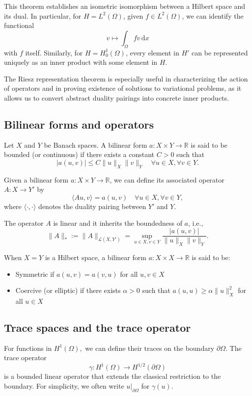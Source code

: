 This theorem establishes an isometric isomorphism between a Hilbert space and its dual. In particular, for $H = L^2(\Omega)$, given $f \in L^2(\Omega)$, we can identify the functional 
\[
v \mapsto \int_\Omega f v \, \mathrm{d}x
\]
with $f$ itself. Similarly, for $H = H^1_0(\Omega)$, every element in $H'$ can be represented uniquely as an inner product with some element in $H$.

The Riesz representation theorem is especially useful in characterizing the action of operators and in proving existence of solutions to variational problems, as it allows us to convert abstract duality pairings into concrete inner products.

\subsection{Bilinear forms and operators}

Let $X$ and $Y$ be Banach spaces. A bilinear form $a: X \times Y \to \mathbb{R}$ is said to be bounded (or continuous) if there exists a constant $C > 0$ such that
\[
|a(u, v)| \leq C \|u\|_X \|v\|_Y \quad \forall u \in X, \forall v \in Y.
\]

Given a bilinear form $a: X \times Y \to \mathbb{R}$, we can define its associated operator $A: X \to Y'$ by
\[
\langle Au, v \rangle = a(u, v) \quad \forall u \in X, \forall v \in Y,
\]
where $\langle \cdot, \cdot \rangle$ denotes the duality pairing between $Y'$ and $Y$.

The operator $A$ is linear and it inherits the boundedness of $a$, i.e.,
\[ 
  \|A\|_* := \|A\|_{\mathcal{L}(X,Y')} = \sup\limits_{u \in X, v \in Y} \frac{|a(u,v)|}{\|u\|_X \|v\|_Y}.
\]

When $X = Y$ is a Hilbert space, a bilinear form $a: X \times X \to \mathbb{R}$ is said to be:
\begin{itemize}
  \item Symmetric if $a(u, v) = a(v, u)$ for all $u, v \in X$
  \item Coercive (or elliptic) if there exists $\alpha > 0$ such that $a(u, u) \geq \alpha \|u\|_X^2$ for all $u \in X$
\end{itemize}

\subsection{Trace spaces and the trace operator}

For functions in $H^1(\Omega),$ we can define their traces on the boundary $\partial\Omega$. The trace operator 
\[
\gamma: H^1(\Omega) \to H^{1/2}(\partial\Omega)
\]
is a bounded linear operator that extends the classical restriction to the boundary. For simplicity, we often write $u|_{\partial\Omega}$ for $\gamma(u)$.

